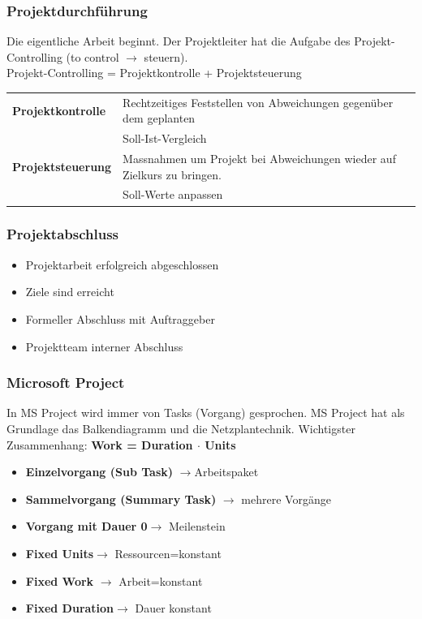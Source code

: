 \subsubsection{Projektdurchführung}
Die eigentliche Arbeit beginnt. Der Projektleiter hat die Aufgabe des Projekt-Controlling (to control $\rightarrow$ steuern).\\
Projekt-Controlling = Projektkontrolle + Projektsteuerung 
\renewcommand{\arraystretch}{1.2}
\begin{table}[h!]
	\begin{tabular}{|l|l|}
		\hline \textbf{Projektkontrolle} 	& Rechtzeitiges Feststellen von Abweichungen gegenüber dem geplanten \\ 
		& Soll-Ist-Vergleich\\
		\hline  \textbf{Projektsteuerung} 	& Massnahmen um Projekt bei Abweichungen wieder auf Zielkurs zu bringen. \\
		& Soll-Werte anpassen\\
		\hline
	\end{tabular}
\end{table}

\subsubsection{Projektabschluss}
\begin{itemize}
	\item Projektarbeit erfolgreich abgeschlossen
	\item Ziele sind erreicht
	\item Formeller Abschluss mit Auftraggeber
	\item Projektteam interner Abschluss
\end{itemize}
\clearpage
\pagebreak
\subsubsection{Microsoft Project}
In MS Project wird immer von Tasks (Vorgang) gesprochen. MS Project hat als Grundlage das Balkendiagramm und die Netzplantechnik.
Wichtigster Zusammenhang: \textbf{Work = Duration $\cdot$ Units}\\
\begin{multicols}{2}
\begin{itemize}
	\item \textbf{Einzelvorgang (Sub Task)} $\rightarrow$Arbeitspaket
	\item \textbf{Sammelvorgang (Summary Task)} $\rightarrow$ mehrere Vorgänge
	\item \textbf{Vorgang mit Dauer 0}$\rightarrow$ Meilenstein	
\end{itemize}
\begin{itemize}
	\item \textbf{Fixed Units}$\rightarrow$ Ressourcen=konstant
	\item \textbf{Fixed Work} $\rightarrow$ Arbeit=konstant
	\item \textbf{Fixed Duration}$\rightarrow$ Dauer konstant
\end{itemize}
\end{multicols}

